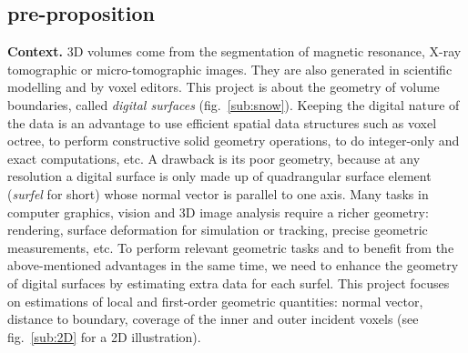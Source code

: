 



\subsection{pre-proposition}

\noindent\textbf{Context.} 
3D volumes come from the segmentation of magnetic resonance, X-ray tomographic or micro-tomographic images. 
They are also generated in scientific modelling and by voxel editors. 
This project is about the geometry of volume boundaries, called \emph{digital surfaces} (fig.~\ref{sub:snow}). 
Keeping the digital nature of the data is an advantage
to use efficient spatial data structures such as voxel octree, 
to perform constructive solid geometry operations,
to do integer-only and exact computations, etc.
A drawback is its poor geometry, because at any resolution a digital surface is only 
made up of quadrangular surface element (\emph{surfel} for short) 
whose normal vector is parallel to one axis. 
Many tasks in computer graphics, vision and 3D image analysis require a richer geometry: 
rendering, surface deformation for simulation or tracking, precise geometric measurements, etc.
To perform relevant geometric tasks and 
to benefit from the above-mentioned advantages in the same time, 
we need to enhance the geometry of digital surfaces by estimating extra data for each surfel. 
This project focuses on estimations of local and first-order geometric quantities: 
normal vector, distance to boundary, coverage of the inner and outer incident voxels 
(see fig.~\ref{sub:2D} for a 2D illustration).  


